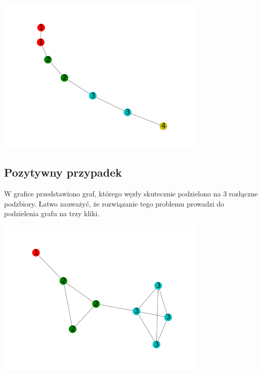 \documentclass[10pt,a4paper]{article}
\begin{document}
\begin{center}
\includegraphics[width=0.75\textwidth]{negatywny.png}
\end{center}

\newpage
\subsection{Pozytywny przypadek}\label{sec:pozytywny}
W grafice przedstawiono graf, którego węzły skutecznie podzielono na 3 rozłączne podzbiory. Łatwo zauważyć, że
rozwiązanie tego problemu prowadzi do podzielenia grafu na trzy kliki.

\begin{center}
\includegraphics[width=0.75\textwidth]{pozytywny.png}
\end{center}
\end{document}
